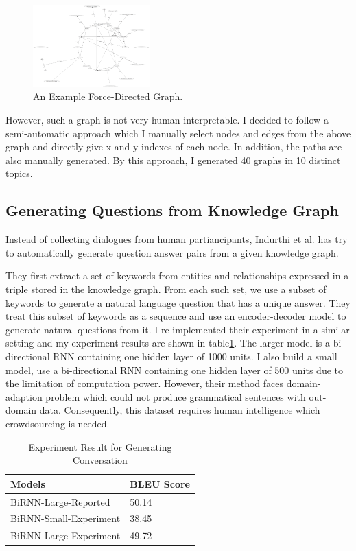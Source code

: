 \documentclass[bsc,frontabs,twoside,singlespacing,parskip,deptreport]{infthesis}     %
\begin{document}
\begin{figure}[h]
    \centering
    \includegraphics[width=0.4\textwidth]{obama.png}
    \caption{An Example Force-Directed Graph.}
    \label{fig:obama}
\end{figure}

However, such a graph is not very human interpretable. I decided to follow a semi-automatic approach which I manually select nodes and edges from the above graph and directly give x and y indexes of each node. In addition, the paths are also manually generated. By this approach, I generated 40 graphs in 10 distinct topics.

\subsection{Generating Questions from Knowledge Graph}

Instead of collecting dialogues from human partiancipants, Indurthi et al.\cite{indurthi2017generating} has try to automatically generate question answer pairs from a given knowledge graph. 

They first extract a set of keywords from entities and relationships expressed in a triple stored in the knowledge graph. From each such set, we use a subset of keywords to generate a natural language question that has a unique answer. They treat this subset of keywords as a sequence and use an encoder-decoder model to generate natural questions from it. I re-implemented their experiment in a similar setting and my experiment results are shown in table\ref{tab:genresult}. The larger model is a bi-directional RNN containing one hidden layer of 1000 units. I also build a small model, use a bi-directional RNN containing one hidden layer of 500 units due to the limitation of computation power. However, their method faces domain-adaption problem which could not produce grammatical sentences with out-domain data. Consequently, this dataset requires human intelligence which crowdsourcing is needed. 

\begin{table}[]
\centering
\begin{tabular}{|l|l|}
\hline
Models                 & BLEU Score \\ \hline
BiRNN-Large-Reported   & 50.14      \\ \hline
BiRNN-Small-Experiment & 38.45      \\ \hline
BiRNN-Large-Experiment & 49.72      \\ \hline
\end{tabular}
\caption{Experiment Result for Generating Conversation\cite{indurthi2017generating}}
\label{tab:genresult}
\end{table}
\end{document}
